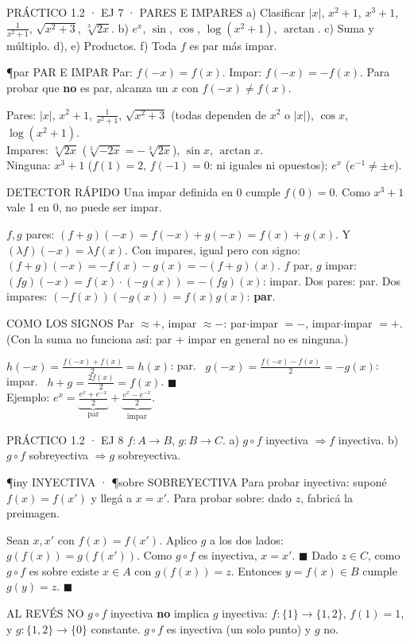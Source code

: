 \begin{enunciado}{PRÁCTICO 1.2 · EJ 7 · PARES E IMPARES}
a) Clasificar $|x|$, $x^2+1$, $x^3+1$, $\frac1{x^2+1}$, $\sqrt{x^2+3}$, $\sqrt[3]{2x}$. b) $e^x$, $\sin$, $\cos$, $\log(x^2+1)$, $\arctan$. c) Suma y múltiplo. d), e) Productos. f) Toda $f$ es par más impar.
\end{enunciado}
\begin{uso}{\P{par} PAR E IMPAR}
Par: $f(-x)=f(x)$. Impar: $f(-x)=-f(x)$. Para probar que \textbf{no} es par, alcanza un $x$ con $f(-x)\neq f(x)$.
\end{uso}
Pares: $|x|$, $x^2+1$, $\frac1{x^2+1}$, $\sqrt{x^2+3}$ (todas dependen de $x^2$ o $|x|$), $\cos x$, $\log(x^2+1)$.\\
Impares: $\sqrt[3]{2x}$ ($\sqrt[3]{-2x}=-\sqrt[3]{2x}$), $\sin x$, $\arctan x$.\\
Ninguna: $x^3+1$ ($f(1)=2$, $f(-1)=0$: ni iguales ni opuestos); $e^x$ ($e^{-1}\neq\pm e$).
\begin{memo}{DETECTOR RÁPIDO}
Una impar definida en 0 cumple $f(0)=0$. Como $x^3+1$ vale 1 en 0, no puede ser impar.
\end{memo}
$f,g$ pares: $(f+g)(-x)=f(-x)+g(-x)=f(x)+g(x)$. Y $(\lambda f)(-x)=\lambda f(x)$. Con impares, igual pero con signo: $(f+g)(-x)=-f(x)-g(x)=-(f+g)(x)$.
$f$ par, $g$ impar: $(fg)(-x)=f(x)\cdot(-g(x))=-(fg)(x)$: impar. Dos pares: par. Dos impares: $(-f(x))(-g(x))=f(x)g(x)$: \textbf{par}.
\begin{tip}{COMO LOS SIGNOS}
Par $\approx+$, impar $\approx-$: par$\cdot$impar $=-$, impar$\cdot$impar $=+$. (Con la suma no funciona así: par + impar en general no es ninguna.)
\end{tip}
$h(-x)=\frac{f(-x)+f(x)}2=h(x)$: par. \ $g(-x)=\frac{f(-x)-f(x)}2=-g(x)$: impar. \ $h+g=\frac{2f(x)}2=f(x)$. $\blacksquare$\\
Ejemplo: $e^x=\underbrace{\tfrac{e^x+e^{-x}}2}_{\text{par}}+\underbrace{\tfrac{e^x-e^{-x}}2}_{\text{impar}}$.

\begin{enunciado}{PRÁCTICO 1.2 · EJ 8}
$f:A\to B$, $g:B\to C$. a) $g\circ f$ inyectiva $\Rightarrow f$ inyectiva. b) $g\circ f$ sobreyectiva $\Rightarrow g$ sobreyectiva.
\end{enunciado}
\begin{uso}{\P{iny} INYECTIVA · \P{sobre} SOBREYECTIVA}
Para probar inyectiva: suponé $f(x)=f(x')$ y llegá a $x=x'$. Para probar sobre: dado $z$, fabricá la preimagen.
\end{uso}
Sean $x,x'$ con $f(x)=f(x')$. Aplico $g$ a los dos lados: $g(f(x))=g(f(x'))$. Como $g\circ f$ es inyectiva, $x=x'$. $\blacksquare$
Dado $z\in C$, como $g\circ f$ es sobre existe $x\in A$ con $g(f(x))=z$. Entonces $y=f(x)\in B$ cumple $g(y)=z$. $\blacksquare$
\begin{trampa}{AL REVÉS NO}
$g\circ f$ inyectiva \textbf{no} implica $g$ inyectiva: $f:\{1\}\to\{1,2\}$, $f(1)=1$, y $g:\{1,2\}\to\{0\}$ constante. $g\circ f$ es inyectiva (un solo punto) y $g$ no.
\end{trampa}


